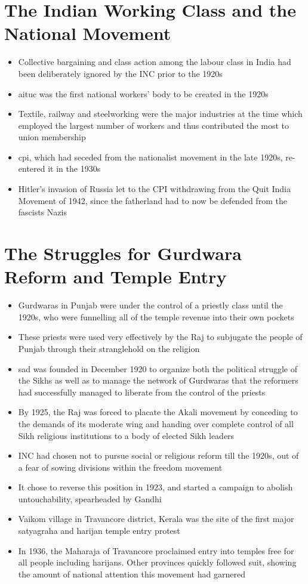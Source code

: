 \section{The Indian Working Class and the National Movement}
\begin{itemize}
    \item Collective bargaining and class action among the labour class in India had been deliberately ignored by the INC prior to the 1920s
    \item \gls{aituc} was the first national workers' body to be created in the 1920s
    \item Textile, railway and steelworking were the major industries at the time which employed the largest number of workers and thus contributed the most to union membership
    \item \gls{cpi}, which had seceded from the nationalist movement in the late 1920s, re-entered it in the 1930s
    \item Hitler's invasion of Russia let to the CPI withdrawing from the Quit India Movement of 1942, since the fatherland had to now be defended from the fascists Nazis
\end{itemize}

\section{The Struggles for Gurdwara Reform and Temple Entry}
\begin{itemize}
    \item Gurdwaras in Punjab were under the control of a priestly class until the 1920s, who were funnelling all of the temple revenue into their own pockets
    \item These priests were used very effectively by the Raj to subjugate the people of Punjab through their stranglehold on the religion
    \item \gls{sad} was founded in December 1920 to organize both the political struggle of the Sikhs as well as to manage the network of Gurdwaras that the reformers had successfully managed to liberate from the control of the priests
    \item By 1925, the Raj was forced to placate the Akali movement by conceding to the demands of its moderate wing and handing over complete control of all Sikh religious institutions to a body of elected Sikh leaders
    \item INC had chosen not to pursue social or religious reform till the 1920s, out of a fear of sowing divisions within the freedom movement
    \item It chose to reverse this position in 1923, and started a campaign to abolish untouchability, spearheaded by Gandhi
    \item Vaikom village in Travancore district, Kerala was the site of the first major satyagraha and harijan temple entry protest
    \item In 1936, the Maharaja of Travancore proclaimed entry into temples free for all people including harijans. Other provinces quickly followed suit, showing the amount of national attention this movement had garnered
\end{itemize}



